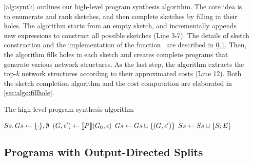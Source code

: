 \cref{alg:synth} outlines our high-level program synthesis algorithm.
%
The core idea is to enumerate and rank sketches, and then complete sketches by filling in their holes.
%
The algorithm starts from an empty sketch, and incrementally appends new expressions to construct all possible sketches (Line 3-7).
%
The details of sketch construction and the implementation of the function \validexpr\ are described in \cref{sec:algo:split}.
%
Then, the algorithm fills holes in each sketch and creates complete programs that generate various network structures.
%
As the last step, the algorithm extracts the top-$k$ network structures according to their approximated costs (Line 12).
%
Both the sketch completion algorithm and the cost computation are elaborated in \cref{sec:algo:fillhole}.

\begin{algorithm}[t]
\small
\captionsetup{font=small} %
\caption{The high-level program synthesis algorithm}\label{alg:synth}
\begin{algorithmic}[1]
        \State $S s, Gs \gets \{\cdot\}, \emptyset$
                    \State $(G, \epsilon') \gets \llbracket P \rrbracket(G_0, \epsilon)$
                    \State $Gs \gets Gs \cup \{(G, \epsilon')\}$
                \EndFor
                \State $Ss \gets Ss \cup \{S;E\}$
            \EndFor
        \EndFor
        \State {}
    \EndFunction
\end{algorithmic}
\end{algorithm}

\subsection{Programs with Output-Directed Splits}\label{sec:algo:split}
%
